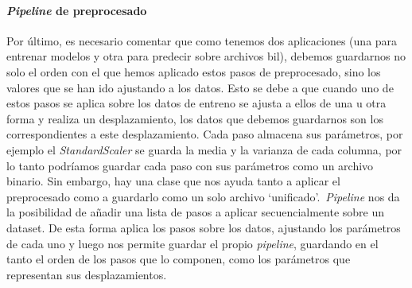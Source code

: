 \paragraph{\textit{Pipeline} de preprocesado}

Por último, es necesario comentar que como tenemos dos aplicaciones (una para entrenar modelos y otra para predecir sobre archivos \gls{bil}),
debemos guardarnos no solo el orden con el que hemos aplicado estos pasos de preprocesado, sino los valores que se han ido ajustando a los datos.
Esto se debe a que cuando uno de estos pasos se aplica sobre los datos de entreno se ajusta a ellos de una u otra forma y realiza un desplazamiento, los datos que debemos guardarnos son los correspondientes a este desplazamiento. Cada paso almacena sus parámetros, por ejemplo el \textit{StandardScaler} se guarda la media y la varianza de cada columna, por lo tanto podríamos guardar cada paso con sus parámetros como un archivo binario. Sin embargo, hay una clase que nos ayuda tanto a aplicar el preprocesado como a guardarlo como un solo archivo `unificado'.\ \textit{Pipeline} nos da la posibilidad de añadir una lista de pasos a aplicar secuencialmente sobre un \gls{dataset}. De esta forma aplica los pasos sobre los datos, ajustando los parámetros de cada uno y luego nos permite guardar el propio \textit{pipeline}, guardando en el tanto el orden de los pasos que lo componen, como los parámetros que representan sus desplazamientos.\ \cite{sklearnp32:online}
